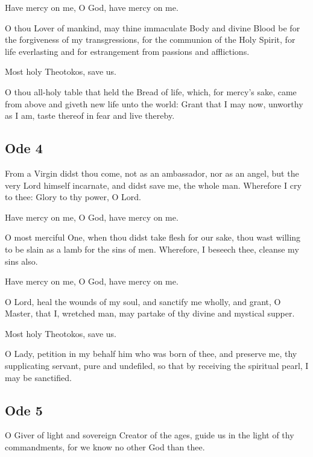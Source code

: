 \hspace{1em} Have mercy on me, O God, have mercy on me.

O thou Lover of mankind, may thine immaculate Body and divine Blood be for the forgiveness of my transgressions, for the communion of the Holy Spirit, for life everlasting and for estrangement from passions and afflictions.

\hspace{1em} Most holy Theotokos, save us.

O thou all-holy table that held the Bread of life, which, for mercy's sake, came from above and giveth new life unto the world: Grant that I may now, unworthy as I am, taste thereof in fear and live thereby.

\subsection{Ode 4}

 From a Virgin didst thou come, not as an ambassador, nor as an angel, but the very Lord himself incarnate, and didst save me, the whole man. Wherefore I cry to thee: Glory to thy power, O Lord.

\hspace{1em} Have mercy on me, O God, have mercy on me.

O most merciful One, when thou didst take flesh for our sake, thou wast willing to be slain as a lamb for the sins of men. Wherefore, I beseech thee, cleanse my sins also.

\hspace{1em} Have mercy on me, O God, have mercy on me.

O Lord, heal the wounds of my soul, and sanctify me wholly, and grant, O Master, that I, wretched man, may partake of thy divine and mystical supper.

\hspace{1em} Most holy Theotokos, save us.

O Lady, petition in my behalf him who was born of thee, and preserve me, thy supplicating servant, pure and undefiled, so that by receiving the spiritual pearl, I may be sanctified.

\subsection{Ode 5}

 O Giver of light and sovereign Creator of the ages, guide us in the light of thy commandments, for we know no other God than thee.


